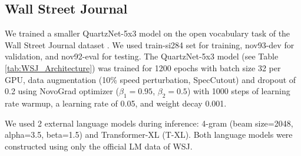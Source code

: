\documentclass{article}
\begin{document}
\begin{table}[!ht]
\centering
\caption{QuartzNet-15x5: large batch training on LibriSpeech, time to train (hours) and greedy WER ($\%$).}
\vspace{4pt}
\label{tab:librispeech_largebatch}
\centering
{}
\end{table}

\subsection{Wall Street Journal}
We trained a smaller QuartzNet-5x3 model on the open vocabulary task of the Wall Street Journal dataset \cite{wsj}. 
We used train-si284 set for training, nov93-dev for validation, and nov92-eval for testing. 
The QuartzNet-5x3 model (see Table \ref{tab:WSJ_Architecture}) was trained for 1200 epochs with batch size 32 per GPU, data augmentation (10\% speed perturbation, SpecCutout)  and dropout of 0.2 using NovoGrad optimizer ($\beta_1=0.95$, $\beta_2=0.5$) with 1000 steps of learning rate warmup, a learning rate of 0.05, and weight decay 0.001. 

We used 2 external language models during inference: 4-gram (beam size=2048, alpha=3.5, beta=1.5) and Transformer-XL (T-XL). Both language models were constructed using only the official LM data of WSJ.
\end{document}
